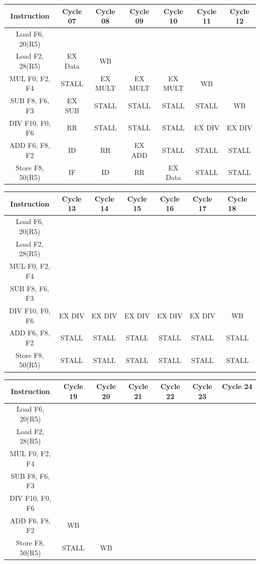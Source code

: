 \documentclass[a4paper, 11pt]{exam}
\begin{document}
\begin{center}
\begin{enumerate}
\begin{enumerate}
\begin{center}
\begin{tabular}{ |c|c|c|c|c|c|c| } 
 \hline
  \textbf{Instruction} & \textbf{Cycle 07} & \textbf{Cycle 08} & \textbf{Cycle 09} & \textbf{Cycle 10} & \textbf{Cycle 11} & 
  \textbf{Cycle 12} \\ 
  \hline
 Load F6, 20(R5) &  &  &  &  &  & \\ \hline
 Load F2, 28(R5) & EX Data & WB &  &  &  & \\ \hline
 MUL F0, F2, F4 & STALL & EX MULT & EX MULT & EX MULT & WB &\\ \hline
 SUB F8, F6, F3 & EX SUB & STALL & STALL & STALL & STALL & WB\\ \hline
 DIV F10, F0, F6 & RR & STALL & STALL & STALL & EX DIV & EX DIV\\ \hline
 ADD F6, F8, F2 & ID & RR & EX ADD & STALL & STALL & STALL\\ \hline
 Store F8, 50(R5) & IF & ID & RR & EX Data & STALL & STALL\\ \hline
\end{tabular}

\begin{tabular}{ |c|c|c|c|c|c|c| } 
 \hline
  \textbf{Instruction} & \textbf{Cycle 13} & \textbf{Cycle 14} & \textbf{Cycle 15} & \textbf{Cycle 16} & \textbf{Cycle 17} & 
  \textbf{Cycle 18 \ \ } \\ 
  \hline
 Load F6, 20(R5) &  &  &  &  &  & \\ \hline
 Load F2, 28(R5) &  &  &  &  &  & \\ \hline
 MUL F0, F2, F4 &  &  &  &  &  & \\ \hline
 SUB F8, F6, F3 &  &  &  &  & & \\ \hline
 DIV F10, F0, F6 & EX DIV & EX DIV & EX DIV & EX DIV & EX DIV & WB\\ \hline
 ADD F6, F8, F2 & STALL & STALL & STALL & STALL & STALL & STALL\\ \hline
 Store F8, 50(R5) & STALL & STALL & STALL & STALL & STALL & STALL\\ \hline
\end{tabular}

\begin{tabular}{ |c|c|c|c|c|c|c| } 
 \hline
  \textbf{Instruction} & \textbf{Cycle 19} & \textbf{Cycle 20} & \textbf{Cycle 21} & \textbf{Cycle 22} & \textbf{Cycle 23} & 
  \textbf{Cycle 24 \ \ } \\ 
  \hline
 Load F6, 20(R5) &  &  &  &  &  & \\ \hline
 Load F2, 28(R5) &  &  &  &  &  & \\ \hline
 MUL F0, F2, F4 &  &  &  &  &  & \\ \hline
 SUB F8, F6, F3 &  &  &  &  &  & \\ \hline
 DIV F10, F0, F6 &  &  &  &  &  & \\ \hline
 ADD F6, F8, F2 & WB &  &  &  &  & \\ \hline
 Store F8, 50(R5) & STALL & WB &  &  &  & \\ \hline
\end{tabular}
\end{center}



\end{enumerate}
\end{enumerate}
\end{center}
\end{document}
